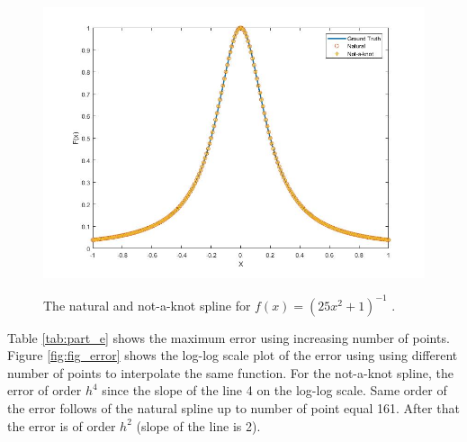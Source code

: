 \begin{figure}[H]
 \centering  
   {\includegraphics[width=0.98\linewidth]{fig/prob2_e.jpg}}   
  \caption{The natural and not-a-knot spline for $f(x)=(25x^2+1)^{-1}$ .}
   \label{fig:fig_e}
\end{figure} 
Table \ref{tab:part_e} shows the maximum error using increasing number of points. Figure \ref{fig:fig_error} shows the log-log scale plot of the error using using different number of points to interpolate the same function. For the not-a-knot spline, the error of order $h^4$ since the slope of the line 4 on the log-log scale. Same order of the error follows of the natural spline up to number of point equal 161. After that the error is of order $h^2$ (slope of the line is 2). 
